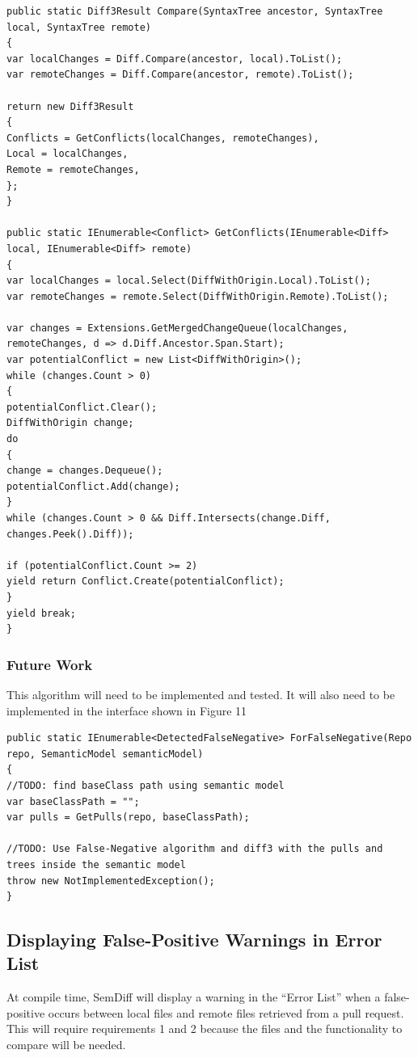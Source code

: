 \documentclass[10pt,draftclsnofoot,onecolumn]{IEEEtran}
\begin{document}
\begingroup
\begin{lstlisting}
public static Diff3Result Compare(SyntaxTree ancestor, SyntaxTree local, SyntaxTree remote)
{
var localChanges = Diff.Compare(ancestor, local).ToList();
var remoteChanges = Diff.Compare(ancestor, remote).ToList();

return new Diff3Result
{
Conflicts = GetConflicts(localChanges, remoteChanges),
Local = localChanges,
Remote = remoteChanges,
};
}

public static IEnumerable<Conflict> GetConflicts(IEnumerable<Diff> local, IEnumerable<Diff> remote)
{
var localChanges = local.Select(DiffWithOrigin.Local).ToList();
var remoteChanges = remote.Select(DiffWithOrigin.Remote).ToList();

var changes = Extensions.GetMergedChangeQueue(localChanges, remoteChanges, d => d.Diff.Ancestor.Span.Start);
var potentialConflict = new List<DiffWithOrigin>();
while (changes.Count > 0)
{
potentialConflict.Clear();
DiffWithOrigin change;
do
{
change = changes.Dequeue();
potentialConflict.Add(change);
}
while (changes.Count > 0 && Diff.Intersects(change.Diff, changes.Peek().Diff));

if (potentialConflict.Count >= 2)
yield return Conflict.Create(potentialConflict);
}
yield break;
}
\end{lstlisting}
\endgroup

\subsubsection{Future Work}
This algorithm will need to be implemented and tested. It will also need to be implemented in the interface shown in Figure 11

\begingroup
\begin{lstlisting}
public static IEnumerable<DetectedFalseNegative> ForFalseNegative(Repo repo, SemanticModel semanticModel)
{
//TODO: find baseClass path using semantic model
var baseClassPath = "";
var pulls = GetPulls(repo, baseClassPath);

//TODO: Use False-Negative algorithm and diff3 with the pulls and trees inside the semantic model
throw new NotImplementedException();
}
\end{lstlisting}
\endgroup

\subsection{Displaying False-Positive Warnings in Error List}
At compile time, SemDiff will display a warning in the “Error List” when a false-positive occurs between local files and remote files retrieved from a pull request. This will require requirements 1 and 2 because the files and the functionality to compare will be needed.
\end{document}
